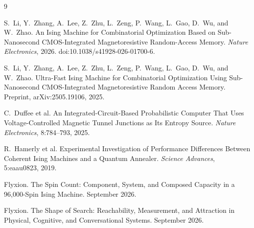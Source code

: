 \documentclass[11pt]{article}
\theoremstyle{definition}
\theoremstyle{remark}
\begin{document}
\begin{thebibliography}{9}

S.~Li, Y.~Zhang, A.~Lee, Z.~Zhu, L.~Zeng, P.~Wang, L.~Gao, D.~Wu, and W.~Zhao.
An Ising Machine for Combinatorial Optimization Based on Sub-Nanosecond CMOS-Integrated Magnetoresistive Random-Access Memory.
\emph{Nature Electronics}, 2026. doi:10.1038/s41928-026-01700-6.

S.~Li, Y.~Zhang, A.~Lee, Z.~Zhu, L.~Zeng, P.~Wang, L.~Gao, D.~Wu, and W.~Zhao.
Ultra-Fast Ising Machine for Combinatorial Optimization Using Sub-Nanosecond CMOS-Integrated Magnetoresistive Random Access Memory.
Preprint, arXiv:2505.19106, 2025.

C.~Duffee et al.
An Integrated-Circuit-Based Probabilistic Computer That Uses Voltage-Controlled Magnetic Tunnel Junctions as Its Entropy Source.
\emph{Nature Electronics}, 8:784--793, 2025.

R.~Hamerly et al.
Experimental Investigation of Performance Differences Between Coherent Ising Machines and a Quantum Annealer.
\emph{Science Advances}, 5:eaau0823, 2019.

Flyxion.
The Spin Count: Component, System, and Composed Capacity in a 96,000-Spin Ising Machine.
September 2026.

Flyxion.
The Shape of Search: Reachability, Measurement, and Attraction in Physical, Cognitive, and Conversational Systems.
September 2026.

\end{thebibliography}
\end{document}
